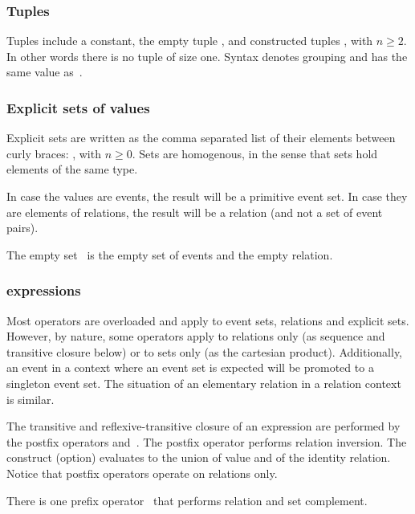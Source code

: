 \subsubsection*{Tuples}
Tuples include a constant, the empty tuple \synt{\T{(}\T{)}},
and constructed tuples
,
with $n \geq 2$. In other words there is no tuple of size one.
Syntax  denotes grouping and has the same
value as~.


\subsubsection*{Explicit sets of values}
Explicit sets are written as the comma separated
list of their elements between curly braces:
,
with $n \geq 0$.
Sets are homogenous, in the sense that sets hold elements of the same type.

In case the values  are events, the result will be a primitive event set.
In case they are elements of relations, the result
will be a relation (and not a set of event pairs).

The empty set~\synt{\T{\{}\T{\}}} is the empty set of events and the empty relation.



\subsubsection*{ expressions}
Most operators are overloaded and apply to event sets, relations and explicit sets.
However, by nature, some operators apply to relations only (as sequence and transitive closure
below) or to sets only (as the cartesian product). Additionally, an event in a context where
an event set is expected will be promoted to a singleton event set. The situation of an
elementary relation in a relation context is similar.

The transitive and reflexive-transitive closure of an expression are performed
by the postfix operators \T{+} and~\T{*}.
The  postfix operator  performs relation inversion.
The construct  (option) evaluates to the union
of   value and of the identity relation.
Notice that postfix operators operate on relations only.

There is one prefix operator~\T{\textasciitilde} that performs
relation and set complement.


